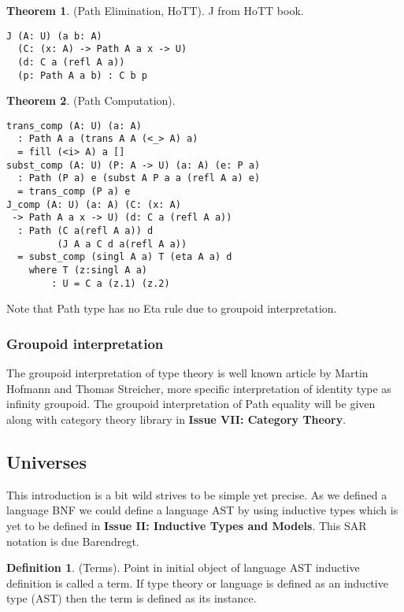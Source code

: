 \documentclass{article}
\theoremstyle{definition}
\newtheorem{theorem}{Theorem}
\newtheorem{definition}{Definition}
\begin{document}
\begin{theorem} (Path Elimination, HoTT).
J from HoTT book.
\begin{lstlisting}
J (A: U) (a b: A)
  (C: (x: A) -> Path A a x -> U)
  (d: C a (refl A a))
  (p: Path A a b) : C b p
\end{lstlisting}
\end{theorem}

\begin{theorem} (Path Computation).
\begin{lstlisting}
trans_comp (A: U) (a: A)
  : Path A a (trans A A (<_> A) a)
  = fill (<i> A) a []
subst_comp (A: U) (P: A -> U) (a: A) (e: P a)
  : Path (P a) e (subst A P a a (refl A a) e)
  = trans_comp (P a) e
J_comp (A: U) (a: A) (C: (x: A)
 -> Path A a x -> U) (d: C a (refl A a))
  : Path (C a(refl A a)) d
         (J A a C d a(refl A a))
  = subst_comp (singl A a) T (eta A a) d
    where T (z:singl A a)
        : U = C a (z.1) (z.2)
\end{lstlisting}
\end{theorem}

Note that  Path type has no Eta rule due to groupoid interpretation.

\subsubsection*{Groupoid interpretation}

The groupoid interpretation of type theory is well known article by Martin Hofmann and Thomas Streicher,
more specific interpretation of identity type as infinity groupoid.
The groupoid interpretation of Path equality will be given along with category theory library
in {\bf Issue VII: Category Theory}.

\subsection{Universes}

This introduction is a bit wild strives to be simple yet precise.
As we defined a language BNF we could define a language AST by
using inductive types which is yet to be defined
in {\bf Issue II: Inductive Types and Models}. This SAR notation is due Barendregt.

\begin{definition} (Terms). Point in initial object of language AST
inductive definition is called a term. If type theory or language is defined as
an inductive type (AST) then the term is defined as its instance.
\end{definition}
\end{document}
